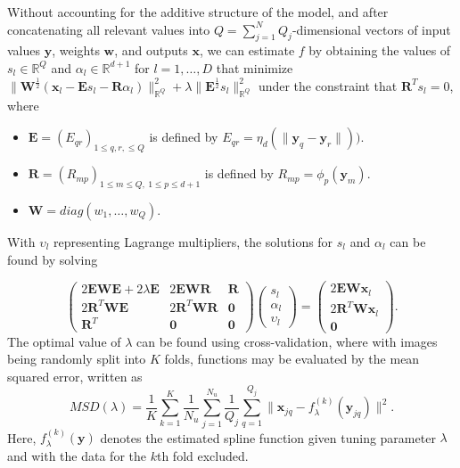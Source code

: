 \documentclass[11pt,reqno]{article}
\theoremstyle{definition}
\begin{document}
Without accounting for the additive structure of the model, and after concatenating all relevant values into $Q = \sum_{j=1}^{N}Q_{j}$-dimensional vectors of input values $\mathbf{y}$, weights $\mathbf{w}$, and outputs $\mathbf{x}$, we can estimate $f$ by obtaining the values of $s_l \in \mathbb{R}^{Q}$ and $\alpha_l \in \mathbb{R}^{d + 1}$ for $l = 1, \dots, D$ that minimize $\|\mathbf{W}^{\frac{1}{2}}\left(\mathbf{x}_{l} - \mathbf{E}s_l - \mathbf{R}\alpha_l\right)\|^2_{\mathbb{R}^{Q}} + \lambda\|\mathbf{E}^{\frac{1}{2}}s_l\|^2_{\mathbb{R}^{Q}}$ under the constraint that $\mathbf{R}^{T}s_l = 0$, where
\begin{itemize}
  \item $\mathbf{E} = (E_{qr})_{1 \leq q, r, \leq Q}$ is defined by $E_{qr} = \eta_{d}\left(\|\mathbf{y}_{q} - \mathbf{y}_{r}\|\right))$.
  \item $\mathbf{R} = \left(R_{mp}\right)_{1 \leq m \leq Q, \ 1 \leq p \leq d + 1}$ is defined by $R_{mp} = \phi_p(\mathbf{y}_{m})$.
  \item $\mathbf{W} = diag(w_{1}, \dots, w_{Q})$.
\end{itemize}

With $\upsilon_l$ representing Lagrange multipliers, the solutions for $s_l$ and $\alpha_l$ can be found by solving

\begin{equation}
   \left(\begin{array}{ccc}
    2\mathbf{EWE} + 2\lambda\mathbf{E} & 2\mathbf{EWR} & \mathbf{R} \\
    2\mathbf{R}^{T}\mathbf{WE} & 2\mathbf{R}^{T}\mathbf{WR} & \mathbf{0} \\
    \mathbf{R}^{T} & \mathbf{0} & \mathbf{0}
  \end{array}\right)\left(
  \begin{array}{c}
    s_l \\
    \alpha_l \\
    \upsilon_l
  \end{array}
  \right) = \left(
  \begin{array}{c}
    2\mathbf{EW}\mathbf{x}_l \\
    2\mathbf{R}^{T}\mathbf{W}\mathbf{x}_l \\
    \mathbf{0}
  \end{array}
  \right). \label{eq:4}
\end{equation}
The optimal value of $\lambda$ can be found using cross-validation, where with images being randomly split into $K$ folds, functions may be evaluated by the mean squared error, written as
\begin{equation}
  MSD(\lambda) = \frac{1}{K}\sum_{k=1}^{K}\frac{1}{N_u}\sum_{j=1}^{N_u}\frac{1}{Q_j}\sum_{q=1}^{Q_j}\|\mathbf{x}_{jq} - f_{\lambda}^{(k)}(\mathbf{y}_{jq})\|^2. \label{eq:5}
\end{equation}
Here, $f_{\lambda}^{(k)}(\mathbf{y})$ denotes the estimated spline function given tuning parameter $\lambda$ and with the data for the $k$th fold excluded.
\end{document}
